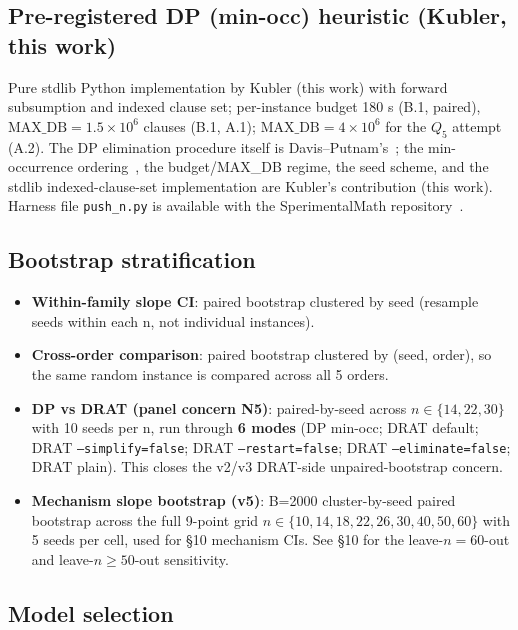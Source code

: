 \documentclass[11pt,a4paper]{article}
\theoremstyle{remark}
\begin{document}
\subsection{Pre-registered DP (min-occ) heuristic (Kubler, this work)}

{\sloppy
Pure stdlib Python implementation by Kubler (this work) with forward
subsumption and indexed clause set; per-instance budget 180 s (B.1,
paired), $\mathrm{MAX\_DB} = 1.5 \times 10^6$ clauses (B.1, A.1);
$\mathrm{MAX\_DB} = 4 \times 10^6$ for the $Q_5$ attempt (A.2). The
DP elimination procedure itself is Davis--Putnam's~\cite{DavisPutnam1960};
the min-occurrence ordering~\cite{Dechter2003}, the budget/MAX\_DB regime,
the seed scheme, and the stdlib indexed-clause-set implementation are
Kubler's contribution (this work). Harness file
\texttt{push\_n.py} is available with the SperimentalMath
repository~\cite{KublerSperimentalMath}.
\par}

\subsection{Bootstrap stratification}

\begin{itemize}
\item \textbf{Within-family slope CI}: paired bootstrap clustered by seed
(resample seeds within each n, not individual instances).
\item \textbf{Cross-order comparison}: paired bootstrap clustered by
(seed, order), so the same random instance is compared across all 5 orders.
\item \textbf{DP vs DRAT (panel concern N5)}: paired-by-seed across
$n \in \{14, 22, 30\}$ with 10 seeds per n, run through \textbf{6 modes}
(DP min-occ; DRAT default; DRAT \texttt{--simplify=false}; DRAT
\texttt{--restart=false}; DRAT \texttt{--eliminate=false}; DRAT plain).
This closes the v2/v3 DRAT-side unpaired-bootstrap concern.
\item \textbf{Mechanism slope bootstrap (v5)}: B=2000 cluster-by-seed
paired bootstrap across the full 9-point grid $n \in
\{10,14,18,22,26,30,40,50,60\}$ with 5 seeds per cell, used for \S10
mechanism CIs. See \S10 for the leave-$n=60$-out and leave-$n \ge 50$-out
sensitivity.
\end{itemize}

\subsection{Model selection}
\end{document}

